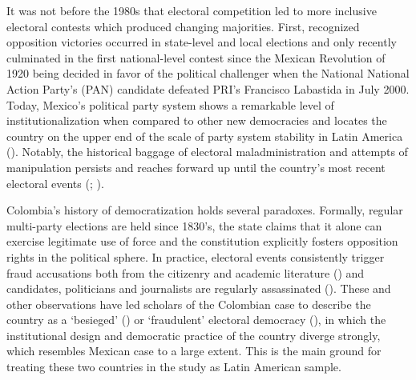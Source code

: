 \documentclass[11pt, ngerman,english,a4]{article}
\begin{document}
It was not before the 1980s that electoral competition led to more inclusive electoral contests which produced changing majorities. First, recognized opposition victories occurred in state-level and local elections and only recently culminated in the first national-level contest since the Mexican Revolution of 1920 being decided in favor of the political challenger when the National National Action Party's (PAN) candidate defeated PRI's Francisco Labastida in July 2000. Today, Mexico's political party system shows a remarkable level of institutionalization when compared to other new democracies and locates the country on the upper end of the scale of party system stability in Latin America (\citealt{Greene2018}). Notably, the historical baggage of electoral maladministration and attempts of manipulation persists and reaches forward up until the country's most recent electoral events (\citealt{Cantu2014}; \citealt{Cantu2019a}). 

Colombia's history of democratization holds several paradoxes. Formally, regular multi-party elections are held since 1830's, the state claims that it alone can exercise legitimate use of force and the constitution explicitly fosters opposition rights in the political sphere. In practice, electoral events consistently trigger fraud accusations both from the citizenry and academic literature (\citealt{DuqueDaza2019}) and candidates, politicians and journalists are regularly assassinated (\citealt{Bejarano2005}). These and other observations have led scholars of the Colombian case to describe the country as a `besieged' (\citealt{Bejarano2005}) or `fraudulent' electoral democracy (\citealt{DuqueDaza2019}), in which the institutional design and democratic practice of the country diverge strongly, which resembles Mexican case to a large extent. This is the main ground for treating these two countries in the study as Latin American sample. 
\end{document}
